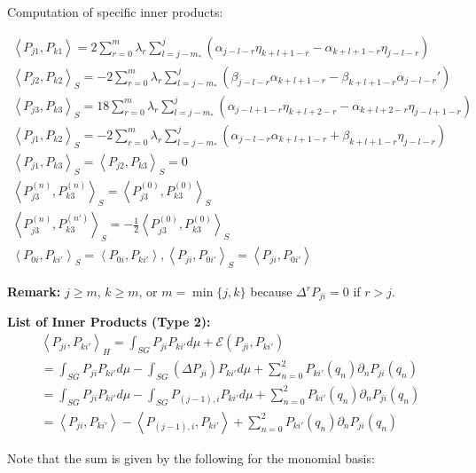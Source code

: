 \documentclass[12pt]{article}
\theoremstyle{plain}
\theoremstyle{definition}
\theoremstyle{remark}
\newcommand{\E}{\mathcal{E}}
\newcommand{\inner}[2]{\left \langle #1, #2\right \rangle}
\newcommand{\lap}{\Delta}
\begin{document}
Computation of specific inner products:

\begin{gather}
    \inner{P_{j1}}{P_{k1}} = 2\sum\limits_{r=0}^{m}\lambda_{r}\sum\limits_{l=j-m_{*}}^{j}\left(\alpha_{j-l-r}\eta_{k+l+1-r}-\alpha_{k+l+1-r}\eta_{j-l-r}\right)\\
    \inner{P_{j2}}{P_{k2}}_S = -2\sum\limits_{r=0}^{m}\lambda_{r}\sum\limits_{l=j-m_{*}}^{j}\left(\beta_{j-l-r}\alpha_{k+l+1-r}-\beta_{k+l+1-r}\alpha_{j-l-r}'\right)\\
    \inner{P_{j3}}{P_{k3}}_S = 18\sum\limits_{r=0}^{m}\lambda_{r}\sum\limits_{l=j-m_{*}}^{j}\left(\alpha_{j-l+1-r}\eta_{k+l+2-r}-\alpha_{k+l+2-r}\eta_{j-l+1-r}\right)\\
    \inner{P_{j1}}{P_{k2}}_S = -2\sum\limits_{r=0}^{m}\lambda_{r}\sum\limits_{l=j-m_{*}}^{j}\left(\alpha_{j-l-r}\alpha_{k+l+1-r}+\beta_{k+l+1-r}\eta_{j-l-r}\right)\\
    \inner{P_{j1}}{P_{k3}}_{S}=\inner{P_{j2}}{P_{k3}}_{S}=0\\
    \inner{P_{j3}^{(n)}}{P_{k3}^{(n)}}_{S}=\inner{P_{j3}^{(0)}}{P_{k3}^{(0)}}_{S}\\
    \inner{P_{j3}^{(n)}}{P_{k3}^{(n')}}_{S}=-\frac{1}{2}\inner{P_{j3}^{(0)}}{P_{k3}^{(0)}}_{S}\\
    \inner{P_{0i}}{P_{ki'}}_{S}=\inner{P_{0i}}{P_{ki'}}, \inner{P_{ji}}{P_{0i'}}_{S}=\inner{P_{ji}}{P_{0i'}}
\end{gather}

\textbf{Remark:}
$j\geq m$, $k\geq m$, or $m=\min\{j, k\}$ because $\lap^{r}P_{ji}=0$ if $r>j$.

\newpage

\textbf{List of Inner Products (Type 2):} 
\begin{gather}
\inner{P_{ji}}{P_{ki'}}_H = \int_{SG} P_{ji}P_{ki'} d \mu  + \E(P_{ji}, P_{ki'})\\
= \int_{SG} P_{ji}P_{ki'} d\mu - \int_{SG} (\lap P_{ji}) P_{ki'} d\mu + \sum_{n = 0}^2 P_{ki'}(q_n)\partial_nP_{ji}(q_n)\\
= \int_{SG} P_{ji}P_{ki'} d\mu - \int_{SG} P_{(j-1),i} P_{ki'} d\mu + \sum_{n = 0}^2 P_{ki'}(q_n)\partial_nP_{ji}(q_n)\\
= \inner{P_{ji}}{P_{ki'}} - \inner{P_{(j-1),i}}{P_{ki'}} + \sum_{n = 0}^2 P_{ki'}(q_n)\partial_nP_{ji}(q_n)
\end{gather}

Note that the sum is given by the following for the monomial basis:
\end{document}
